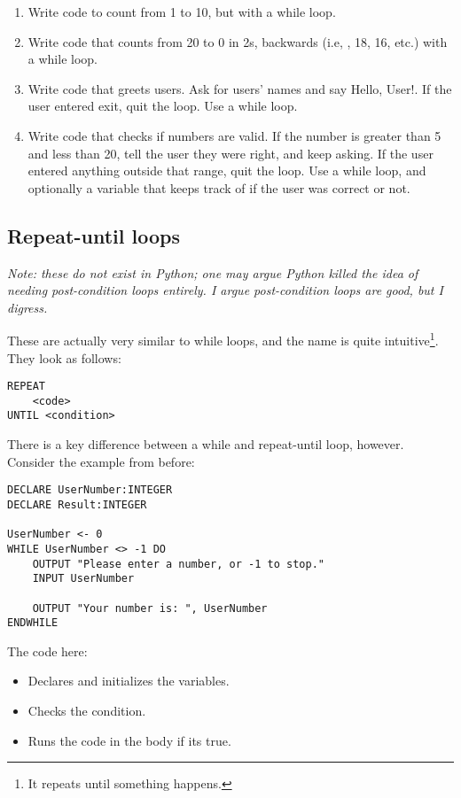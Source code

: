 \documentclass[./main.tex]{subfiles}
\begin{document}
\begin{enumerate}
    \item Write code to count from 1 to 10, but with a while loop.
        \mediumlines
    \item Write code that counts from 20 to 0 in 2s, backwards (i.e, {, 18, 16}, etc.) with a while loop.
        \mediumlines
    \item Write code that greets users. Ask for users' names and say {\ccmono Hello, User!}. If the user entered {\ccmono exit}, quit the loop. Use a while loop.
        \largelines
    \item Write code that checks if numbers are valid. If the number is greater than 5 and less than 20, tell the user they were right, and keep asking. If the user entered anything outside that range, quit the loop. Use a while loop, and optionally a variable that keeps track of if the user was correct or not.
        \largelines
\end{enumerate}

\newpage
\subsection{Repeat-until loops}

\emph{Note: these do not exist in Python; one may argue Python killed the idea of needing post-condition loops entirely. I argue post-condition loops are good, but I digress.}

These are actually very similar to while loops, and the name is quite intuitive\footnote{It repeats until something happens.}. They look as follows:

\begin{verbatim}
REPEAT
    <code>
UNTIL <condition>
\end{verbatim}

There is a key difference between a while and repeat-until loop, however. Consider the example from before:

\begin{verbatim}
DECLARE UserNumber:INTEGER
DECLARE Result:INTEGER

UserNumber <- 0
WHILE UserNumber <> -1 DO 
    OUTPUT "Please enter a number, or -1 to stop."
    INPUT UserNumber

    OUTPUT "Your number is: ", UserNumber
ENDWHILE
\end{verbatim}

The code here:

\begin{itemize}
    \item Declares and initializes the variables.
    \item Checks the condition.
    \item Runs the code in the body if its true.
\end{itemize}
\end{document}
